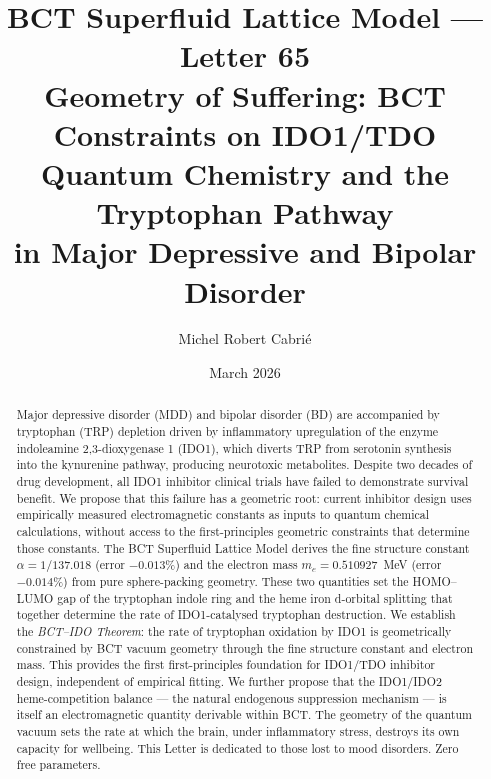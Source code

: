 \documentclass[aps,prl,preprint,superscriptaddress,floatfix]{revtex4-2}
\begin{document}
\title{BCT Superfluid Lattice Model --- Letter 65\\
Geometry of Suffering: BCT Constraints on IDO1/TDO\\
Quantum Chemistry and the Tryptophan Pathway\\
in Major Depressive and Bipolar Disorder}

\author{Michel Robert Cabri\'e}
\date{March 2026}

\begin{abstract}
Major depressive disorder (MDD) and bipolar disorder (BD) are accompanied
by tryptophan (TRP) depletion driven by inflammatory upregulation of the
enzyme indoleamine 2,3-dioxygenase 1 (IDO1), which diverts TRP from
serotonin synthesis into the kynurenine pathway, producing neurotoxic
metabolites. Despite two decades of drug development, all IDO1 inhibitor
clinical trials have failed to demonstrate survival benefit. We propose that
this failure has a geometric root: current inhibitor design uses empirically
measured electromagnetic constants as inputs to quantum chemical calculations,
without access to the first-principles geometric constraints that determine
those constants. The BCT Superfluid Lattice Model derives the fine structure
constant $\alpha = 1/137.018$ (error $-0.013\%$) and the electron mass
$m_e = 0.510927$~MeV (error $-0.014\%$) from pure sphere-packing geometry.
These two quantities set the HOMO--LUMO gap of the tryptophan indole ring
and the heme iron d-orbital splitting that together determine the rate of
IDO1-catalysed tryptophan destruction. We establish the \textit{BCT--IDO
Theorem}: the rate of tryptophan oxidation by IDO1 is geometrically
constrained by BCT vacuum geometry through the fine structure constant and
electron mass. This provides the first first-principles foundation for
IDO1/TDO inhibitor design, independent of empirical fitting. We further
propose that the IDO1/IDO2 heme-competition balance --- the natural
endogenous suppression mechanism --- is itself an electromagnetic quantity
derivable within BCT. The geometry of the quantum vacuum sets the rate at
which the brain, under inflammatory stress, destroys its own capacity for
wellbeing. This Letter is dedicated to those lost to mood disorders.
Zero free parameters.
\end{abstract}

\maketitle
\end{document}
